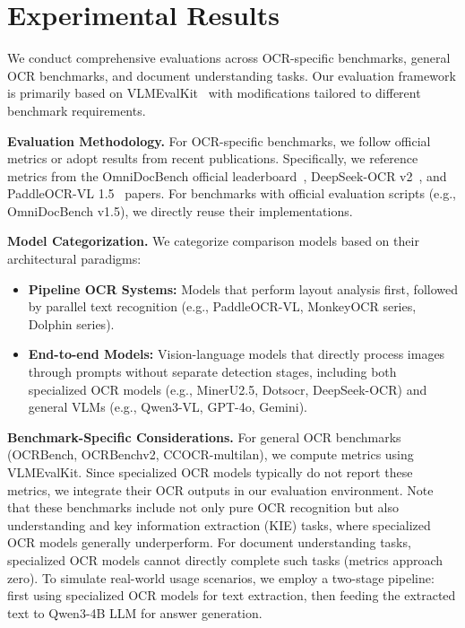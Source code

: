 \documentclass[dvipsnames]{article}
\begin{document}
\section{Experimental Results}
\label{sec:evaluation}

We conduct comprehensive evaluations across OCR-specific benchmarks, general OCR benchmarks, and document understanding tasks. Our evaluation framework is primarily based on VLMEvalKit~\citep{duan2024vlmevalkit} with modifications tailored to different benchmark requirements.

\textbf{Evaluation Methodology.} For OCR-specific benchmarks, we follow official metrics or adopt results from recent publications. Specifically, we reference metrics from the OmniDocBench official leaderboard~\citep{ouyang2024omnidocbench}, DeepSeek-OCR v2~\citep{wei2026deepseekocr2visualcausal}, and PaddleOCR-VL 1.5~\citep{cui2026paddleocrvl15} papers. For benchmarks with official evaluation scripts (e.g., OmniDocBench v1.5), we directly reuse their implementations.

\textbf{Model Categorization.} We categorize comparison models based on their architectural paradigms:
\begin{itemize}[noitemsep,topsep=0pt]
\item \textbf{Pipeline OCR Systems:} Models that perform layout analysis first, followed by parallel text recognition (e.g., PaddleOCR-VL, MonkeyOCR series, Dolphin series).
\item \textbf{End-to-end Models:} Vision-language models that directly process images through prompts without separate detection stages, including both specialized OCR models (e.g., MinerU2.5, Dotsocr, DeepSeek-OCR) and general VLMs (e.g., Qwen3-VL, GPT-4o, Gemini).
\end{itemize}

\textbf{Benchmark-Specific Considerations.} For general OCR benchmarks (OCRBench, OCRBenchv2, CCOCR-multilan), we compute metrics using VLMEvalKit. Since specialized OCR models typically do not report these metrics, we integrate their OCR outputs in our evaluation environment. Note that these benchmarks include not only pure OCR recognition but also understanding and key information extraction (KIE) tasks, where specialized OCR models generally underperform. For document understanding tasks, specialized OCR models cannot directly complete such tasks (metrics approach zero). To simulate real-world usage scenarios, we employ a two-stage pipeline: first using specialized OCR models for text extraction, then feeding the extracted text to Qwen3-4B LLM for answer generation.
\end{document}
